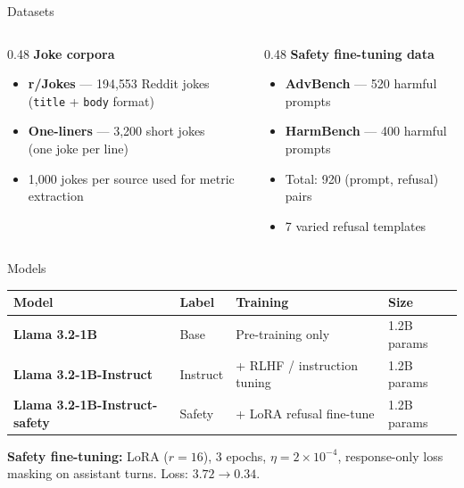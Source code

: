 \documentclass[aspectratio=169,10pt]{beamer}
\begin{document}
\begin{frame}{Datasets}
  \begin{columns}[T]
    \begin{column}{0.48\textwidth}
      \textbf{Joke corpora}
      \begin{itemize}
        \item \textbf{r/Jokes} --- 194{,}553 Reddit jokes\\
              (\texttt{title} + \texttt{body} format)
        \item \textbf{One-liners} --- 3{,}200 short jokes\\
              (one joke per line)
        \item 1{,}000 jokes per source used for metric extraction
      \end{itemize}
    \end{column}
    \begin{column}{0.48\textwidth}
      \textbf{Safety fine-tuning data}
      \begin{itemize}
        \item \textbf{AdvBench} --- 520 harmful prompts
        \item \textbf{HarmBench} --- 400 harmful prompts
        \item Total: 920 (prompt, refusal) pairs
        \item 7 varied refusal templates
      \end{itemize}
    \end{column}
  \end{columns}
\end{frame}

\begin{frame}{Models}
  \begin{center}
  \begin{tabular}{llll}
    \toprule
    \textbf{Model} & \textbf{Label} & \textbf{Training} & \textbf{Size} \\
    \midrule
    \textcolor{baseblue}{\textbf{Llama 3.2-1B}} & Base & Pre-training only & 1.2B params \\[4pt]
    \textcolor{instructorange}{\textbf{Llama 3.2-1B-Instruct}} & Instruct & + RLHF / instruction tuning & 1.2B params \\[4pt]
    \textcolor{safetygreen}{\textbf{Llama 3.2-1B-Instruct-safety}} & Safety & + LoRA refusal fine-tune & 1.2B params \\
    \bottomrule
  \end{tabular}
  \end{center}

  \vspace{0.8em}
  \textbf{Safety fine-tuning:} LoRA ($r{=}16$), 3 epochs, $\eta{=}2{\times}10^{-4}$,
  response-only loss masking on assistant turns. Loss: $3.72 \to 0.34$.
\end{frame}
\end{document}
